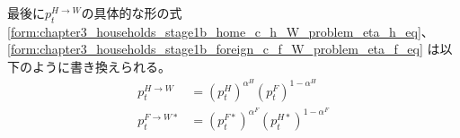 最後に\(p_t^{H\to W}\)の具体的な形の式
\eqref{form:chapter3_households_stage1b_home_c_h_W_problem_eta_h_eq}、
\eqref{form:chapter3_households_stage1b_foreign_c_f_W_problem_eta_f_eq}
は以下のように書き換えられる。
\begin{align}
    \label{form:chapter3_households_stage1b_cpi_descriptions_p_H_W_eq}
        p_t^{H\to W}&=(p_t^H)^{\alpha^H}(p_t^F)^{1-\alpha^H} \\
    \label{form:chapter3_households_stage1b_cpi_descriptions_p_F_W_star_eq}
        p_t^{F\to W*}&=(p_t^{F*})^{\alpha^F}(p_t^{H*})^{1-\alpha^F}
\end{align}